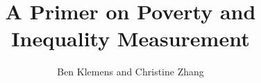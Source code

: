 \documentclass{book}
\begin{document}
\renewcommand{\comment}[1]{}
\author{Ben Klemens and Christine Zhang}
\title{A Primer on Poverty and Inequality Measurement}
\maketitle


\tableofcontents







\end{document}
